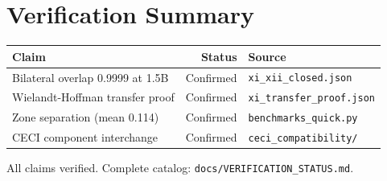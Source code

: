 \documentclass[11pt,a4paper]{article}
\begin{document}
\newpage

\section{Verification Summary}

\begin{table}[h]
\centering
\begin{tabular}{lrl}
\toprule
Claim & Status & Source \\
\midrule
Bilateral overlap 0.9999 at 1.5B & Confirmed & \texttt{xi\_xii\_closed.json} \\
Wielandt-Hoffman transfer proof & Confirmed & \texttt{xi\_transfer\_proof.json} \\
Zone separation (mean 0.114) & Confirmed & \texttt{benchmarks\_quick.py} \\
CECI component interchange & Confirmed & \texttt{ceci\_compatibility/} \\
\bottomrule
\end{tabular}
\end{table}

\vspace{12pt}
\noindent All claims verified. Complete catalog: \texttt{docs/VERIFICATION\_STATUS.md}.

\newpage
\end{document}
